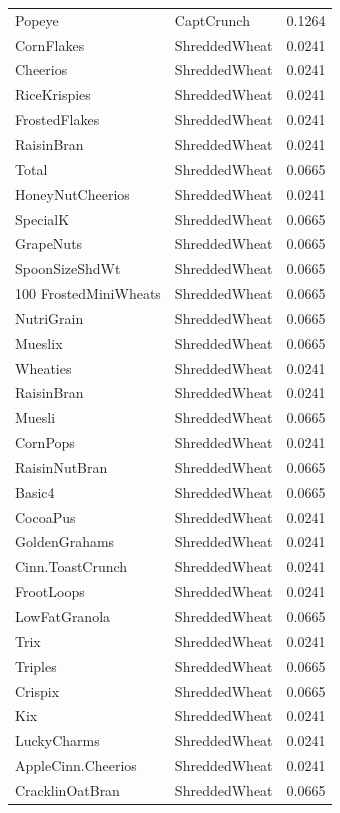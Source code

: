 \begin{longtable}{llr}
Popeye & CaptCrunch & 0.1264 \\
CornFlakes & ShreddedWheat & 0.0241 \\
Cheerios & ShreddedWheat & 0.0241 \\
RiceKrispies & ShreddedWheat & 0.0241 \\
FrostedFlakes & ShreddedWheat & 0.0241 \\
RaisinBran & ShreddedWheat & 0.0241 \\
Total & ShreddedWheat & 0.0665 \\
HoneyNutCheerios & ShreddedWheat & 0.0241 \\
SpecialK & ShreddedWheat & 0.0665 \\
GrapeNuts & ShreddedWheat & 0.0665 \\
SpoonSizeShdWt & ShreddedWheat & 0.0665 \\
100%
FrostedMiniWheats & ShreddedWheat & 0.0665 \\
NutriGrain & ShreddedWheat & 0.0665 \\
Mueslix & ShreddedWheat & 0.0665 \\
Wheaties & ShreddedWheat & 0.0241 \\
RaisinBran & ShreddedWheat & 0.0241 \\
Muesli & ShreddedWheat & 0.0665 \\
CornPops & ShreddedWheat & 0.0241 \\
RaisinNutBran & ShreddedWheat & 0.0665 \\
Basic4 & ShreddedWheat & 0.0665 \\
CocoaPus & ShreddedWheat & 0.0241 \\
GoldenGrahams & ShreddedWheat & 0.0241 \\
Cinn.ToastCrunch & ShreddedWheat & 0.0241 \\
FrootLoops & ShreddedWheat & 0.0241 \\
LowFatGranola & ShreddedWheat & 0.0665 \\
Trix & ShreddedWheat & 0.0241 \\
Triples & ShreddedWheat & 0.0665 \\
Crispix & ShreddedWheat & 0.0665 \\
Kix & ShreddedWheat & 0.0241 \\
LuckyCharms & ShreddedWheat & 0.0241 \\
AppleCinn.Cheerios & ShreddedWheat & 0.0241 \\
CracklinOatBran & ShreddedWheat & 0.0665 \\

\end{longtable}
